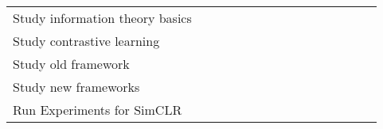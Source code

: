 \begin{table}[H]
{\begin{tabular}{lcccccc|ccccccll}
            \multicolumn{1}{l|}{Study information theory basics} &                                                 &                          & \cellcolor[HTML]{036400} & \cellcolor[HTML]{036400} &                          &                          &                          &                                              &                                              &                                              &                                              &                                              &                          &                          \\
            \multicolumn{1}{l|}{Study contrastive learning}      &                                                 &                          &                          & \cellcolor[HTML]{036400} & \cellcolor[HTML]{036400} & \cellcolor[HTML]{036400} &                          &                                              &                                              &                                              &                                              &                                              &                          &                          \\
            \multicolumn{1}{l|}{Study old framework}             &                                                 &                          &                          &                          &                          & \cellcolor[HTML]{036400} & \cellcolor[HTML]{036400} & \cellcolor[HTML]{036400}                     &                                              &                                              &                                              &                                              &                          &                          \\
            \multicolumn{1}{l|}{Study new frameworks}            & \multicolumn{1}{l}{}                            & \multicolumn{1}{l}{}     & \multicolumn{1}{l}{}     & \multicolumn{1}{l}{}     & \multicolumn{1}{l}{}     & \multicolumn{1}{l|}{}    & \multicolumn{1}{l}{}     & \multicolumn{1}{l}{\cellcolor[HTML]{036400}} & \multicolumn{1}{l}{\cellcolor[HTML]{036400}} & \multicolumn{1}{l}{\cellcolor[HTML]{036400}} & \multicolumn{1}{l}{\cellcolor[HTML]{036400}} & \multicolumn{1}{l}{}                         &                          &                          \\
            \multicolumn{1}{l|}{Run Experiments for SimCLR}      &                                                 &                          &                          &                          &                          &                          &                          &                                              &                                              &                                              & \cellcolor[HTML]{036400}                     & \cellcolor[HTML]{036400}                     & \cellcolor[HTML]{036400} & \cellcolor[HTML]{036400} \\

\end{tabular}}
\end{table}
